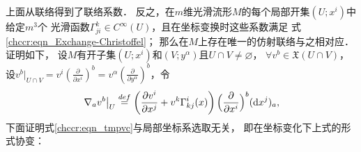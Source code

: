 上面从联络得到了联络系数．
反之，在$m$维光滑流形$M$的每个局部开集$(U;x^i)$中给定$m^3$个
光滑函数$\Gamma^{k}_{ji}\in C^\infty(U)$，且在坐标变换时这些系数满足
式\eqref{chccr:eqn_Exchange-Christoffel}；
那么在$M$上存在唯一的仿射联络与之相对应．证明如下，
设$M$有开子集$(U;x^i)$和$(V;y^\alpha)$且$U\cap V \neq \varnothing$，
$\forall v^b\in \mathfrak{X}(U\cap V)$，设$v^b|_{U\cap V}
=v^i(\frac{\partial}{\partial x^i})^b
=v^\alpha(\frac{\partial}{\partial y^\alpha})^b$，令
\begin{equation}\label{chccr:eqn_tmpvc}
       \left. \nabla_a v^b \right|_{U}  \overset{def}{=}
    \left(\frac{\partial v^i}{\partial x^j} +v^k \Gamma_{kj}^{i}(x) \right)
           \Bigl(\frac{\partial}{\partial x^i}\Bigr)^b ({\rm d}x^j)_a ,
\end{equation}
下面证明式\eqref{chccr:eqn_tmpvc}与局部坐标系选取无关，
即在坐标变化下上式的形式协变：
